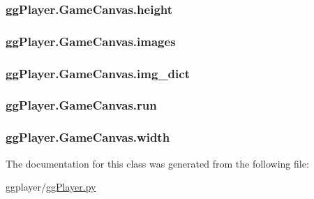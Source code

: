\hypertarget{classgg_player_1_1_game_canvas_a801eb36c0f8fb9927b6843263243d49b}{
\subsubsection[{height}]{\setlength{\rightskip}{0pt plus 5cm}gg\-Player.\-Game\-Canvas.\-height}}\label{classgg_player_1_1_game_canvas_a801eb36c0f8fb9927b6843263243d49b}
\hypertarget{classgg_player_1_1_game_canvas_ad2337a4445e3a20847859f101e83fe4c}{
\subsubsection[{images}]{\setlength{\rightskip}{0pt plus 5cm}gg\-Player.\-Game\-Canvas.\-images}}\label{classgg_player_1_1_game_canvas_ad2337a4445e3a20847859f101e83fe4c}
\hypertarget{classgg_player_1_1_game_canvas_ade98cc3308349102b56503d9e3315dc3}{
\subsubsection[{img\-\_\-dict}]{\setlength{\rightskip}{0pt plus 5cm}gg\-Player.\-Game\-Canvas.\-img\-\_\-dict}}\label{classgg_player_1_1_game_canvas_ade98cc3308349102b56503d9e3315dc3}
\hypertarget{classgg_player_1_1_game_canvas_a2313c2d189e08686e0b3ecbbf6c3c6b0}{
\subsubsection[{run}]{\setlength{\rightskip}{0pt plus 5cm}gg\-Player.\-Game\-Canvas.\-run}}\label{classgg_player_1_1_game_canvas_a2313c2d189e08686e0b3ecbbf6c3c6b0}
\hypertarget{classgg_player_1_1_game_canvas_aa8882a242adc63c849416b7b558dc2f8}{
\subsubsection[{width}]{\setlength{\rightskip}{0pt plus 5cm}gg\-Player.\-Game\-Canvas.\-width}}\label{classgg_player_1_1_game_canvas_aa8882a242adc63c849416b7b558dc2f8}


The documentation for this class was generated from the following file\-:\begin{DoxyCompactItemize}
\item 
ggplayer/\hyperlink{gg_player_8py}{gg\-Player.\-py}\end{DoxyCompactItemize}
